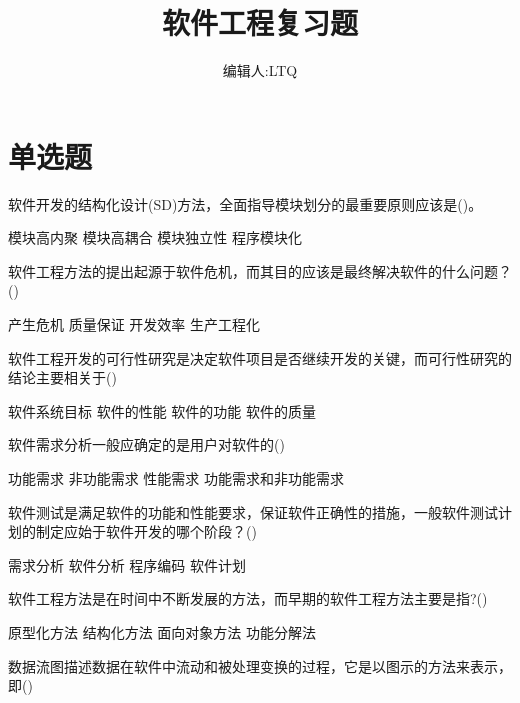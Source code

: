 \documentclass[answers]{exam}
\title{软件工程复习题}
\author{编辑人:LTQ}
\date{}
\begin{document}
\maketitle
\section{单选题}
\begin{questions}
	\question 软件开发的结构化设计(SD)方法，全面指导模块划分的最重要原则应该是()。\\
	\begin{oneparchoices}
		\choice 模块高内聚
		\choice 模块高耦合
		\correctchoice 模块独立性
		\choice 程序模块化
	\end{oneparchoices}
	\question 软件工程方法的提出起源于软件危机，而其目的应该是最终解决软件的什么问题？()\\
	\begin{oneparchoices}
		\choice 产生危机
		\choice 质量保证
		\choice 开发效率
		\correctchoice 生产工程化
	\end{oneparchoices}
	\question 软件工程开发的可行性研究是决定软件项目是否继续开发的关键，而可行性研究的结论主要相关于()\\
	\begin{oneparchoices}
		\correctchoice 软件系统目标
		\choice 软件的性能
		\choice 软件的功能
		\choice 软件的质量
	\end{oneparchoices}
	\question 软件需求分析一般应确定的是用户对软件的()\\
	\begin{oneparchoices}
		\choice 功能需求
		\choice 非功能需求
		\choice 性能需求
		\correctchoice 功能需求和非功能需求
	\end{oneparchoices}
	\question 软件测试是满足软件的功能和性能要求，保证软件正确性的措施，一般软件测试计划的制定应始于软件开发的哪个阶段？()\\
	\begin{oneparchoices}
		\correctchoice 需求分析
		\choice 软件分析
		\choice 程序编码
		\choice 软件计划
	\end{oneparchoices}
	\question 软件工程方法是在时间中不断发展的方法，而早期的软件工程方法主要是指?()\\
	\begin{oneparchoices}
		\choice 原型化方法
		\correctchoice 结构化方法
		\choice 面向对象方法
		\choice 功能分解法
	\end{oneparchoices}
	\question 数据流图描述数据在软件中流动和被处理变换的过程，它是以图示的方法来表示，即()\\
	\begin{oneparchoices}

\end{oneparchoices}
\end{questions}
\end{document}
